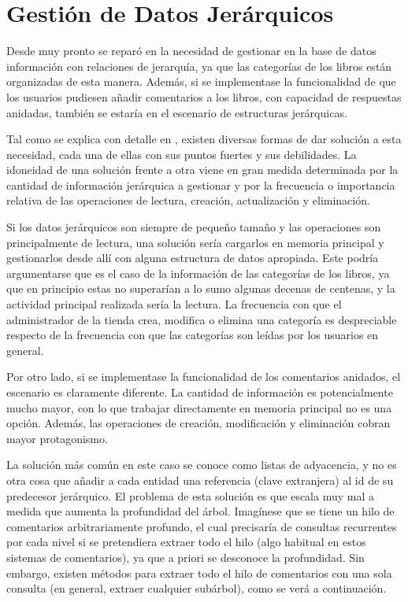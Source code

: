 \documentclass[a4paper,12pt,twoside,openright]{report}
\begin{document}
    \section{Gestión de Datos Jerárquicos} \label{sec:hierarchy}
    Desde muy pronto se reparó en la necesidad de gestionar en la base de datos información con relaciones de jerarquía, ya que las categorías de los libros están organizadas de esta manera. Además, si se implementase la funcionalidad de que los usuarios pudiesen añadir comentarios a los libros, con capacidad de respuestas anidadas, también se estaría en el escenario de estructuras jerárquicas.
    
    Tal como se explica con detalle en \cite{Karwin2010}, existen diversas formas de dar solución a esta necesidad, cada una de ellas con sus puntos fuertes y sus debilidades. La idoneidad de una solución frente a otra viene en gran medida determinada por la cantidad de información jerárquica a gestionar y por la frecuencia o importancia relativa de las operaciones de lectura, creación, actualización y eliminación.
    
    Si los datos jerárquicos son siempre de pequeño tamaño y las operaciones son principalmente de lectura, una solución sería cargarlos en memoria principal y gestionarlos desde allí con alguna estructura de datos apropiada. Este podría argumentarse que es el caso de la información de las categorías de los libros, ya que en principio estas no superarían a lo sumo algunas decenas de centenas, y la actividad principal realizada sería la lectura. La frecuencia con que el administrador de la tienda crea, modifica o elimina una categoría es despreciable respecto de la frecuencia con que las categorías son leídas por los usuarios en general.
    
    Por otro lado, si se implementase la funcionalidad de los comentarios anidados, el escenario es claramente diferente. La cantidad de información es potencialmente mucho mayor, con lo que trabajar directamente en memoria principal no es una opción. Además, las operaciones de creación, modificación y eliminación cobran mayor protagonismo.
    
    La solución más común en este caso se conoce como listas de adyacencia, y no es otra cosa que añadir a cada entidad una referencia (clave extranjera) al id de su predecesor jerárquico. El problema de esta solución es que escala muy mal a medida que aumenta la profundidad del árbol. Imagínese que se tiene un hilo de comentarios arbitrariamente profundo, el cual precisaría de consultas recurrentes por cada nivel si se pretendiera extraer todo el hilo (algo habitual en estos sistemas de comentarios), ya que a priori se desconoce la profundidad. Sin embargo, existen métodos para extraer todo el hilo de comentarios con una sola consulta (en general, extraer cualquier subárbol), como se verá a continuación.
    
\end{document}

